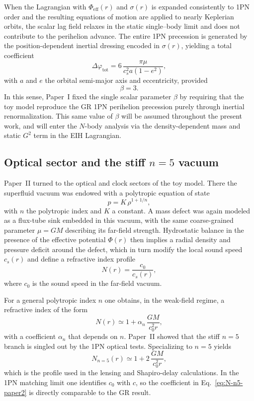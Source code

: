 \documentclass[11pt]{article}
\newcommand{\cS}{c_s}
\begin{document}
When the Lagrangian with $\Phi_{\mathrm{eff}}(r)$ and $\sigma(r)$ is
expanded consistently to 1PN order and the resulting equations of
motion are applied to nearly Keplerian orbits, the scalar lag field
relaxes in the static single–body limit and does not contribute to
the perihelion advance.
The entire 1PN precession is generated by the position-dependent
inertial dressing encoded in $\sigma(r)$, yielding a total
coefficient
\begin{equation}
  \Delta\varphi_{\text{tot}}
  = 6\,\frac{\pi \mu}{\cS^2 a(1-e^2)},
\end{equation}
with $a$ and $e$ the orbital semi-major axis and eccentricity,
provided
\begin{equation}
  \beta = 3.
\end{equation}
In this sense, Paper~I fixed the single scalar parameter $\beta$ by
requiring that the toy model reproduce the GR 1PN perihelion
precession purely through inertial renormalization.
This same value of $\beta$ will be assumed throughout the present
work, and will enter the $N$-body analysis via the density-dependent
mass and static $G^2$ term in the EIH Lagrangian.

\subsection{Optical sector and the stiff \texorpdfstring{$n=5$}{n=5} vacuum}
\label{subsec:inputs-optics}

Paper~II turned to the optical and clock sectors of the toy model.
There the superfluid vacuum was endowed with a polytropic equation
of state
\begin{equation}
  p = K\,\rho^{1+1/n},
\end{equation}
with $n$ the polytropic index and $K$ a constant.
A mass defect was again modeled as a flux-tube sink embedded in this
vacuum, with the same coarse-grained parameter $\mu = GM$ describing
its far-field strength.
Hydrostatic balance in the presence of the effective potential
$\Phi(r)$ then implies a radial density and pressure deficit around
the defect, which in turn modify the local sound speed
$c_s(r)$ and define a refractive index profile
\begin{equation}
  N(r) = \frac{c_0}{c_s(r)},
\end{equation}
where $c_0$ is the sound speed in the far-field vacuum.

For a general polytropic index $n$ one obtains, in the weak-field
regime, a refractive index of the form
\begin{equation}
  N(r) \simeq 1 + \alpha_n\,\frac{GM}{c_0^2 r},
\end{equation}
with a coefficient $\alpha_n$ that depends on $n$.
Paper~II showed that the stiff $n=5$ branch is singled out by the
1PN optical tests.
Specializing to $n=5$ yields
\begin{equation}
  N_{n=5}(r)
  \simeq 1 + 2\,\frac{GM}{c_0^2 r},
  \label{eq:N-n5-paper2}
\end{equation}
which is the profile used in the lensing and Shapiro-delay
calculations.
In the 1PN matching limit one identifies $c_0$ with $c$, so the
coefficient in Eq.~\eqref{eq:N-n5-paper2} is directly comparable to
the GR result.
\end{document}
